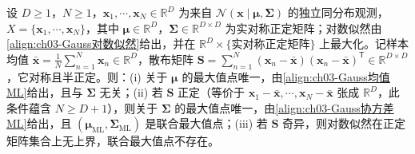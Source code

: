 \documentclass[../../main.tex]{subfiles}
\begin{document}
\begin{proposition}\label{proposition:ch03-Gauss最大似然}
设 $D\geqslant1$，$N\geqslant1$，$\boldsymbol{x}_1,\cdots,\boldsymbol{x}_N\in\mathbb{R}^{D}$ 为来自 $\mathcal{N}(\boldsymbol{x}\mid\boldsymbol{\mu},\boldsymbol{\Sigma})$ 的独立同分布观测，$X=\{\boldsymbol{x}_1,\cdots,\boldsymbol{x}_N\}$，其中 $\boldsymbol{\mu}\in\mathbb{R}^{D}$，$\boldsymbol{\Sigma}\in\mathbb{R}^{D\times D}$ 为实对称正定矩阵；对数似然由\eqref{align:ch03-Gauss对数似然}给出，并在 $\mathbb{R}^{D}\times\{\text{实对称正定矩阵}\}$ 上最大化。记样本均值 $\bar{\boldsymbol{x}}=\frac{1}{N}\sum_{n=1}^{N}\boldsymbol{x}_n\in\mathbb{R}^{D}$，散布矩阵 $\boldsymbol{S}=\sum_{n=1}^{N}(\boldsymbol{x}_n-\bar{\boldsymbol{x}})(\boldsymbol{x}_n-\bar{\boldsymbol{x}})^{\mathsf{T}}\in\mathbb{R}^{D\times D}$，它对称且半正定。则：(i) 关于 $\boldsymbol{\mu}$ 的最大值点唯一，由\eqref{align:ch03-Gauss均值ML}给出，且与 $\boldsymbol{\Sigma}$ 无关；(ii) 若 $\boldsymbol{S}$ 正定（等价于 $\boldsymbol{x}_1-\bar{\boldsymbol{x}},\cdots,\boldsymbol{x}_N-\bar{\boldsymbol{x}}$ 张成 $\mathbb{R}^{D}$，此条件蕴含 $N\geqslant D+1$），则关于 $\boldsymbol{\Sigma}$ 的最大值点唯一，由\eqref{align:ch03-Gauss协方差ML}给出，且 $(\boldsymbol{\mu}_{\mathrm{ML}},\boldsymbol{\Sigma}_{\mathrm{ML}})$ 是联合最大值点；(iii) 若 $\boldsymbol{S}$ 奇异，则对数似然在正定矩阵集合上无上界，联合最大值点不存在。
\end{proposition}
\end{document}
